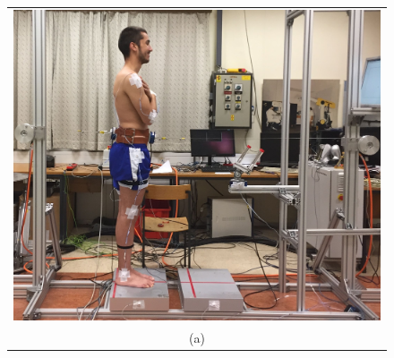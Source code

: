 \begin{figure}
  \centering
  \begin{tabular}{c}
    \includegraphics[width=0.75\columnwidth]{Morteza/figs/stance.jpg} \\
    (a)\\
    

\end{tabular}
\end{figure}
